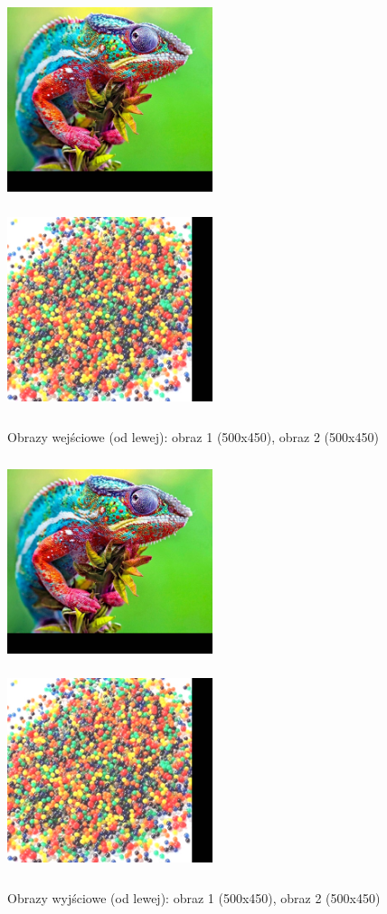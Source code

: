 \documentclass[magisterska,openany]{pracadypl}
\begin{document}
\newpage
\begin{figure}[h]
\centering
\includegraphics[width=6cm, height=6cm]{2_3/GeoRGB3.jpg}
\includegraphics[width=6cm, height=6cm]{2_3/GeoRGB4.jpg}
\caption{Obrazy wejściowe (od lewej): obraz 1 (500x450), obraz 2 (500x450) }
\end{figure}
\begin{figure}[h]
\centering
\includegraphics[width=6cm, height=6cm]{2_4/ResolRGB3.jpg}
\includegraphics[width=6cm, height=6cm]{2_4/ResolRGB4.jpg}
\caption{Obrazy wyjściowe (od lewej): obraz 1 (500x450), obraz 2 (500x450) }
\end{figure}
\end{document}
